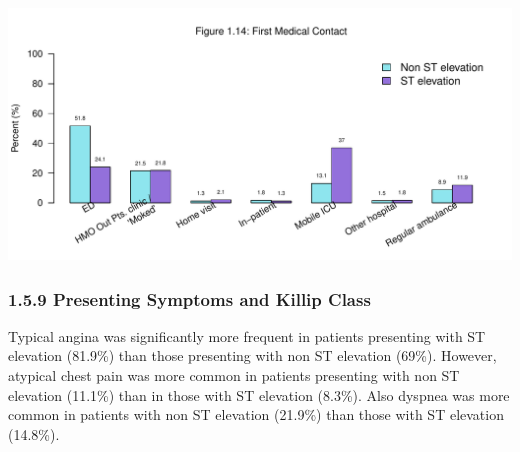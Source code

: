 \documentclass[
]{article}
\begin{document}
\includegraphics{‏‏ACSIS_2024_v1_with_trend_pdf_files/figure-latex/unnamed-chunk-49-1.pdf}

\pagebreak

\subsubsection{1.5.9 Presenting Symptoms and Killip
Class}\label{presenting-symptoms-and-killip-class}

Typical angina was significantly more frequent in patients presenting
with ST elevation (81.9\%) than those presenting with non ST elevation
(69\%). However, atypical chest pain was more common in patients
presenting with non ST elevation (11.1\%) than in those with ST
elevation (8.3\%). Also dyspnea was more common in patients with non ST
elevation (21.9\%) than those with ST elevation (14.8\%).

~
\end{document}
